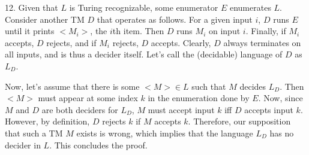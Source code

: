 \documentclass{article}
\begin{document}
12. Given that $L$ is Turing recognizable, some enumerator $E$ enumerates $L$. Consider another TM $D$ that operates as follows. For a given input $i$, $D$ runs $E$ until it prints $<M_i>$, the $i$th item. Then $D$ runs $M_i$ on input $i$. Finally, if $M_i$ accepts, $D$ rejects, and if $M_i$ rejects, $D$ accepts. Clearly, $D$ always terminates on all inputs, and is thus a decider itself. Let's call the (decidable) language of $D$ as $L_D$.

Now, let's assume that there is some $<M> \in L$ such that $M$ decides $L_D$. Then $<M>$ must appear at some index $k$ in the enumeration done by $E$. Now, since $M$ and $D$ are both deciders for $L_D$, $M$ must accept input $k$ iff $D$ accepts input $k$. However, by definition, $D$ rejects $k$ if $M$ accepts $k$. Therefore, our supposition that such a TM $M$ exists is wrong, which implies that the language $L_D$ has no decider in $L$. This concludes the proof.
\end{document}
